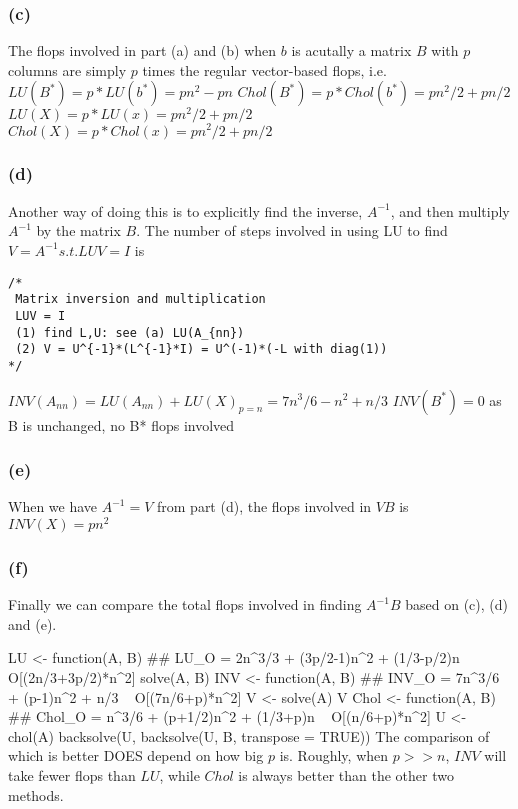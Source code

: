 \documentclass{article}
\begin{document}
\subsubsection*{(c)}
The flops involved in part (a) and (b) when $b$ is acutally a matrix $B$ with $p$ columns are
simply $p$ times the regular vector-based flops, i.e.
\newline
$LU(B^*)  = p*LU(b^*) = pn^2 - pn$
\newline
$Chol(B^*) = p*Chol(b^*)  = pn^2/2 + pn/2$
\newline
\hbox{}
\newline
$LU(X) = p*LU(x) = pn^2/2 + pn/2$
\newline
$Chol(X) = p*Chol(x) = pn^2/2 + pn/2$

\subsubsection*{(d)}
Another way of doing this is to explicitly find the inverse, $A^{-1}$, and then multiply
$A^{-1}$ by the matrix $B$. The number of steps involved in using LU to find 
$V=A^{-1}  s.t.  LUV = I$ is
\begin{lstlisting}
/* 
 Matrix inversion and multiplication
 LUV = I
 (1) find L,U: see (a) LU(A_{nn})
 (2) V = U^{-1}*(L^{-1}*I) = U^(-1)*(-L with diag(1))
*/
\end{lstlisting}
$INV(A_{nn}) = LU(A_{nn}) + LU(X)_{p=n} = 7n^3/6 - n^2 + n/3$
\newline
$INV(B^*)  = 0 $ \hspace{12 pt} as B is unchanged, no B* flops involved

\subsubsection*{(e)}
When we have $A^{-1}=V$ from part (d), the flops involved in $VB$ is \newline
$INV(X) = pn^2$

\subsubsection*{(f)}
Finally we can compare the total flops involved in finding $A^{-1}B$ based on (c), (d) and (e).

LU <- function(A, B){ ## LU_O   = 2n^3/3 + (3p/2-1)n^2 + (1/3-p/2)n ~ O[(2n/3+3p/2)*n^2]
	solve(A, B)
}
INV <- function(A, B){ ## INV_O  = 7n^3/6 + (p-1)n^2 + n/3 ~ O[(7n/6+p)*n^2]
	V <- solve(A)
	V %
}
Chol <- function(A, B){ ## Chol_O = n^3/6 + (p+1/2)n^2 + (1/3+p)n ~ O[(n/6+p)*n^2]
	U <- chol(A)
	backsolve(U, backsolve(U, B, transpose = TRUE))
}
The comparison of which is better DOES depend on how big $p$ is. Roughly, when $p>>n$, $INV$ will
take fewer flops than $LU$, while $Chol$ is always better than the other two methods.
\end{document}
